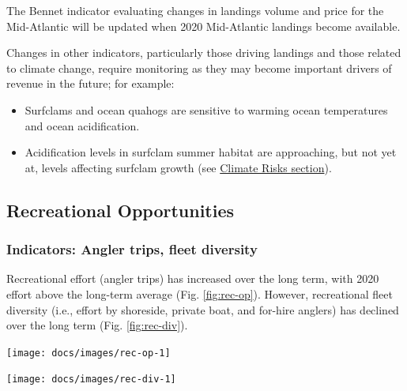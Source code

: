 \documentclass[
  10pt,
]{article}
\providecommand{\tightlist}{%
  \setlength{\itemsep}{0pt}\setlength{\parskip}{0pt}}
\let\origfigure\figure
\let\endorigfigure\endfigure
\renewenvironment{figure}[1][2] {
    \expandafter\origfigure\expandafter[H]
} {
    \endorigfigure
}
\begin{document}
The Bennet indicator evaluating changes in landings volume and price for
the Mid-Atlantic will be updated when 2020 Mid-Atlantic landings become
available.

Changes in other indicators, particularly those driving landings and
those related to climate change, require monitoring as they may become
important drivers of revenue in the future; for example:

\begin{itemize}
\tightlist
\item
  Surfclams and ocean quahogs are sensitive to warming ocean
  temperatures and ocean acidification.\\
\item
  Acidification levels in surfclam summer habitat are approaching, but
  not yet at, levels affecting surfclam growth (see
  \protect\hyperlink{climate-and-ecosystem-productivity}{Climate Risks
  section}).
\end{itemize}

\hypertarget{recreational-opportunities}{%
\subsection{Recreational
Opportunities}\label{recreational-opportunities}}

\hypertarget{indicators-angler-trips-fleet-diversity}{%
\subsubsection{Indicators: Angler trips, fleet
diversity}\label{indicators-angler-trips-fleet-diversity}}

Recreational effort (angler trips) has increased over the long term,
with 2020 effort above the long-term average (Fig. \ref{fig:rec-op}).
However, recreational fleet diversity (i.e., effort by shoreside,
private boat, and for-hire anglers) has declined over the long term
(Fig. \ref{fig:rec-div}).

\begin{figure}

{\centering \texttt{[image: docs/images/rec-op-1]} 

}

\caption{Recreational effort in the Mid-Atlantic.}\label{fig:rec-op}
\end{figure}

\begin{figure}

{\centering \texttt{[image: docs/images/rec-div-1]} 

}

\caption{Recreational fleet effort diversity in the Mid-Atlantic.}\label{fig:rec-div}
\end{figure}
\end{document}
